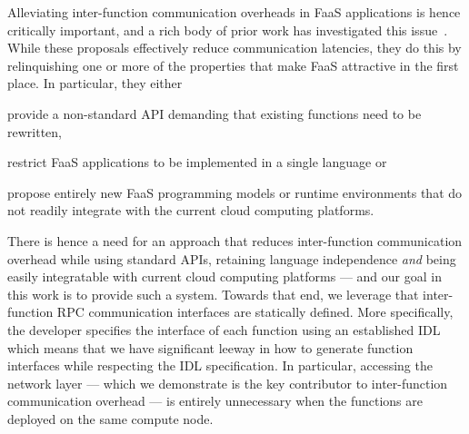 
Alleviating inter-function communication overheads in FaaS applications is hence critically important, and a rich body of prior work has investigated this issue~\cite{kotni21_faast, mahgoub22_wisef, barcelona-pons19_faas_track,sreekanti20_cloud,shillaker20_faasm,jia21_night}. While these proposals effectively reduce communication latencies, they do this by relinquishing one or more of the properties that make FaaS attractive in the first place. In particular,  they either \begin{inparaenum}[1)] \item provide a non-standard API demanding that existing functions need to be rewritten, \item restrict FaaS applications to be implemented in a single language or \item propose entirely new FaaS programming models or runtime environments that do not readily integrate with the current cloud computing platforms. \end{inparaenum} 

There is hence a need for an approach that reduces inter-function communication overhead while using standard APIs, retaining language independence {\it and} being easily integratable with current cloud computing platforms --- and our goal in this work is to provide such a system. Towards that end, we leverage that inter-function RPC communication interfaces are statically defined.
More specifically, the developer specifies the interface of each function using an established IDL which means that we have significant leeway in how to generate function interfaces while respecting the IDL specification. In particular, accessing the network layer --- which we demonstrate is the key contributor to inter-function communication overhead --- is entirely unnecessary when the functions are deployed on the same compute node.


